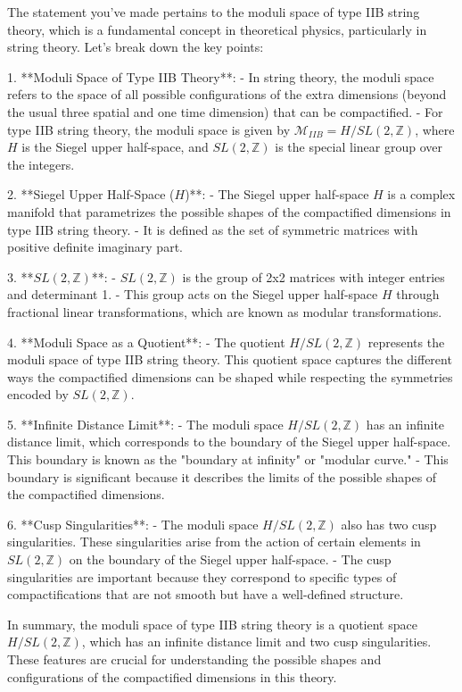 The statement you've made pertains to the moduli space of type IIB string theory, which is a fundamental concept in theoretical physics, particularly in string theory. Let's break down the key points:

1. **Moduli Space of Type IIB Theory**:
   - In string theory, the moduli space refers to the space of all possible configurations of the extra dimensions (beyond the usual three spatial and one time dimension) that can be compactified.
   - For type IIB string theory, the moduli space is given by \( \mathcal{M}_{IIB} = H / SL(2, \mathbb{Z}) \), where \( H \) is the Siegel upper half-space, and \( SL(2, \mathbb{Z}) \) is the special linear group over the integers.

2. **Siegel Upper Half-Space (\( H \))**:
   - The Siegel upper half-space \( H \) is a complex manifold that parametrizes the possible shapes of the compactified dimensions in type IIB string theory.
   - It is defined as the set of symmetric matrices with positive definite imaginary part.

3. **\( SL(2, \mathbb{Z}) \)**:
   - \( SL(2, \mathbb{Z}) \) is the group of 2x2 matrices with integer entries and determinant 1.
   - This group acts on the Siegel upper half-space \( H \) through fractional linear transformations, which are known as modular transformations.

4. **Moduli Space as a Quotient**:
   - The quotient \( H / SL(2, \mathbb{Z}) \) represents the moduli space of type IIB string theory. This quotient space captures the different ways the compactified dimensions can be shaped while respecting the symmetries encoded by \( SL(2, \mathbb{Z}) \).

5. **Infinite Distance Limit**:
   - The moduli space \( H / SL(2, \mathbb{Z}) \) has an infinite distance limit, which corresponds to the boundary of the Siegel upper half-space. This boundary is known as the "boundary at infinity" or "modular curve."
   - This boundary is significant because it describes the limits of the possible shapes of the compactified dimensions.

6. **Cusp Singularities**:
   - The moduli space \( H / SL(2, \mathbb{Z}) \) also has two cusp singularities. These singularities arise from the action of certain elements in \( SL(2, \mathbb{Z}) \) on the boundary of the Siegel upper half-space.
   - The cusp singularities are important because they correspond to specific types of compactifications that are not smooth but have a well-defined structure.

In summary, the moduli space of type IIB string theory is a quotient space \( H / SL(2, \mathbb{Z}) \), which has an infinite distance limit and two cusp singularities. These features are crucial for understanding the possible shapes and configurations of the compactified dimensions in this theory.